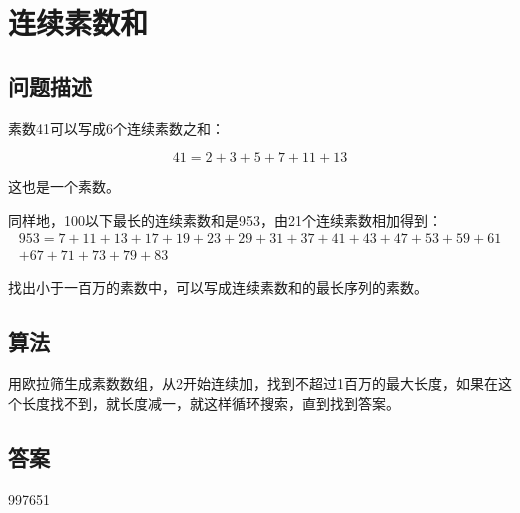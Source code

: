 \section{连续素数和}
\subsection{问题描述}
\begin{tcolorbox}
	素数41可以写成6个连续素数之和：

	\[
		41 = 2 + 3 + 5 + 7 + 11 + 13
	\]

	这也是一个素数。

	同样地，100以下最长的连续素数和是953，由21个连续素数相加得到：
	\begin{multline*}
		953 = 7 + 11 + 13 + 17 + 19 + 23 + 29 + 31 + 37 + 41 + 43 + 47 + 53 + 59 + 61\\ + 67 + 71 + 73 + 79 + 83
	\end{multline*}

	找出小于一百万的素数中，可以写成连续素数和的最长序列的素数。

\end{tcolorbox}

\subsection{算法}
用欧拉筛生成素数数组，从2开始连续加，找到不超过1百万的最大长度，如果在这个长度找不到，就长度减一，就这样循环搜索，直到找到答案。

\subsection{答案}
997651
